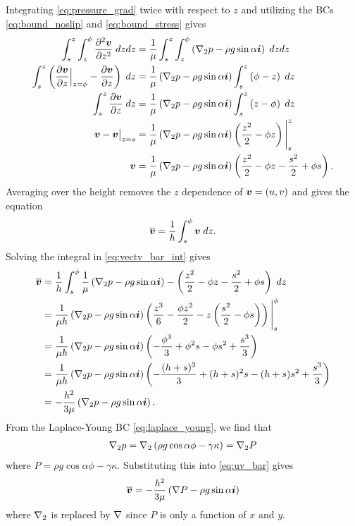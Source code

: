 Integrating \cref{eq:pressure_grad} twice with respect to $z$ and utilizing the BCs  \cref{eq:bound_noslip} and \cref{eq:bound_stress} gives
\begin{align}
    \nonumber \int_{s}^{z}\int_{z}^{\phi} \pderivtwo{\vect{v}}{z} \; dzdz &= \frac{1}{\mu}\int_{s}^{z}\int_{z}^{\phi} \lrp{\grad_2 p - \rho g \sin\alpha\vect{i}} \; dzdz \\
    \nonumber \int_{s}^{z} \lrp{\evalat[\Big]{\pderiv{\vect{v}}{z}}{z = \phi} - \pderiv{\vect{v}}{z}} \; dz &= \frac{1}{\mu} \lrp{\grad_2 p - \rho g \sin\alpha\vect{i}} \int_{s}^{z}\lrp{\phi - z} \; dz\\
    \nonumber \int_{s}^{z} \pderiv{\vect{v}}{z} \; dz &= \frac{1}{\mu} \lrp{\grad_2 p - \rho g \sin\alpha\vect{i}} \int_{s}^{z} \lrp{z - \phi} \; dz\\
    \nonumber \vect{v} - \evalat{\vect{v}}{z = s} &= \frac{1}{\mu} \lrp{\grad_2 p - \rho g \sin\alpha\vect{i}}  \lrp{\frac{z^2}{2} - \phi z} \Bigg|_{s}^z\\
    \vect{v} &=\frac{1}{\mu} \lrp{\grad_2 p - \rho g \sin\alpha\vect{i}} \lrp{\frac{z^2}{2} - \phi z - \frac{s^2}{2} + \phi s}. 
    \label{eq:vel_vectv}
\end{align}
Averaging over the height removes the $z$ dependence of $\boldsymbol{v} = \left( u, v \right)$ and gives the equation 
\begin{align}
    \overline{\boldsymbol{v}} = \frac{1}{h} \int_{s}^{\phi} \boldsymbol{v} \; dz.
    \label{eq:vectv_bar_int}
\end{align}
Solving the integral in \cref{eq:vectv_bar_int} gives 
\begin{align}
    \nonumber \overline{\boldsymbol{v}} &= \frac{1}{h} \int_{s}^{\phi} \frac{1}{\mu} \left( \nabla_2 p - \rho g \sin\alpha\boldsymbol{i} \right) -  \left( \frac{z^2}{2} - \phi z - \frac{s^2}{2} + \phi s \right)  \; dz\\
    \nonumber &= \frac{1}{\mu h} \left( \nabla_2 p - \rho g \sin\alpha\boldsymbol{i} \right) \left( \frac{z^3}{6} - \frac{\phi z^2}{2} - z\left( \frac{s^2}{2} - \phi s \right) \right) \Bigg|_{s}^{\phi}\\
    \nonumber &= \frac{1}{\mu h} \left( \nabla_2 p - \rho g \sin\alpha\boldsymbol{i} \right) \left( -\frac{\phi^3}{3} + \phi^2s - \phi s^2 + \frac{s^3}{3} \right)\\
    \nonumber &=  \frac{1}{\mu h} \left( \nabla_2 p - \rho g \sin\alpha\boldsymbol{i} \right) \left( -\frac{(h+s)^3}{3} + (h+s)^2s - (h+s) s^2 + \frac{s^3}{3} \right)\\
    &= -\frac{h^2}{3\mu} \left( \nabla_2 p - \rho g \sin\alpha\boldsymbol{i} \right).
    \label{eq:uv_bar}
\end{align}
From the Laplace-Young BC \cref{eq:laplace_young}, we find that 
\begin{align}
    \nabla_2 p = \nabla_2 \left( \rho g \cos \alpha \phi - \gamma \kappa \right) = \nabla_2 P
    \label{eq:grad2_p}
\end{align}
where $P = \rho g \cos \alpha \phi - \gamma \kappa$. Substituting this into \cref{eq:uv_bar} gives 
\begin{align}
    \overline{\boldsymbol{v}} = -\frac{h^2}{3\mu} \left( \nabla P - \rho g \sin \alpha \boldsymbol{i} \right)
    \label{eq:uv_bar_final}
\end{align}
where $\nabla_2$ is replaced by $\nabla$ since $P$ is only a function of $x$ and $y$. 

